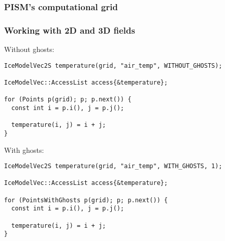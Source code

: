 \documentclass[hide notes,intlimits]{beamer}
\begin{document}
\begin{frame}
  \frametitle{PISM's computational grid}
  
\end{frame}

\begin{frame}[fragile]
  \frametitle{Working with 2D and 3D fields}

  Without ghosts:
\begin{lstlisting}
IceModelVec2S temperature(grid, "air_temp", WITHOUT_GHOSTS);

IceModelVec::AccessList access{&temperature};

for (Points p(grid); p; p.next()) {
  const int i = p.i(), j = p.j();

  temperature(i, j) = i + j;
}
\end{lstlisting}

  With ghosts:
\begin{lstlisting}
IceModelVec2S temperature(grid, "air_temp", WITH_GHOSTS, 1);

IceModelVec::AccessList access{&temperature};

for (PointsWithGhosts p(grid); p; p.next()) {
  const int i = p.i(), j = p.j();

  temperature(i, j) = i + j;
}
\end{lstlisting}
  
\end{frame}
\end{document}
